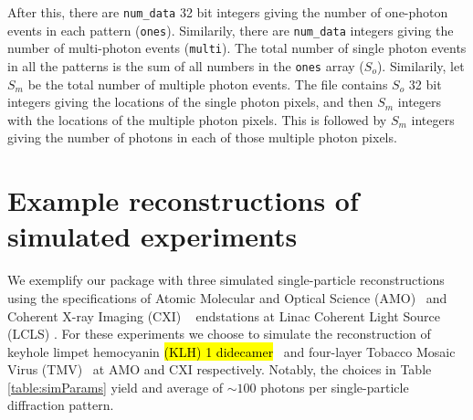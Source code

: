 \documentclass[preprint]{iucr}              %
\begin{document}
After this, there are \texttt{num\_data} 32 bit integers giving the number of one-photon events in each pattern (\texttt{ones}). Similarily, there are \texttt{num\_data} integers giving the number of multi-photon events (\texttt{multi}). The total number of single photon events in all the patterns is the sum of all numbers in the \texttt{ones} array ($S_o$). Similarily, let $S_m$ be the total number of multiple photon events. The file contains $S_o$ 32 bit integers giving the locations of the single photon pixels, and then $S_m$ integers with the locations of the multiple photon pixels. This is followed by $S_m$ integers giving the number of photons in each of those multiple photon pixels. 

\section{Example reconstructions of simulated experiments}\label{sec:simulations}

We exemplify our package with three simulated single-particle reconstructions using the specifications of Atomic Molecular and Optical Science (AMO)~\cite{ferguson2015} and Coherent X-ray Imaging (CXI) ~\cite{liang2015} endstations at Linac Coherent Light Source (LCLS) \cite{Emma2010}. For these experiments we choose to simulate the reconstruction of keyhole limpet hemocyanin \hl{(KLH) 1 didecamer}~\cite{gatsogiannis2009} and four-layer Tobacco Mosaic Virus (TMV)~\cite{bhyravbhatla1998} at AMO and CXI respectively. Notably, the choices in Table \ref{table:simParams} yield and average of $\sim 100$ photons per single-particle diffraction pattern.
\end{document}
